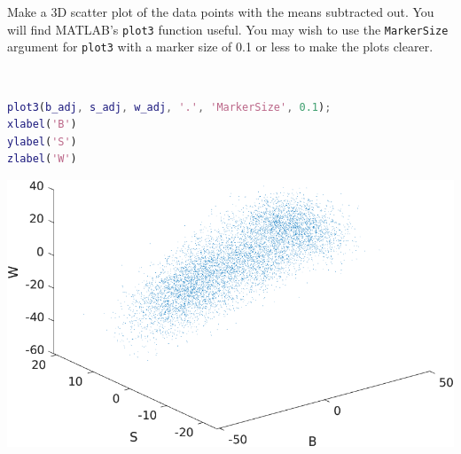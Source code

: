 Make a 3D scatter plot of the data points with the means subtracted out. You will find MATLAB’s \texttt{plot3} function useful. You may wish to use the \texttt{MarkerSize} argument for \texttt{plot3} with a marker size of 0.1 or less to make the plots clearer.

\begin{solution} \
    \begin{lstlisting}[language=Matlab]
plot3(b_adj, s_adj, w_adj, '.', 'MarkerSize', 0.1);
xlabel('B')
ylabel('S')
zlabel('W')
    \end{lstlisting}
    
    \begin{center}
        \includegraphics[width=.6\textwidth]{img/e10p2.png}
    \end{center}
\end{solution}